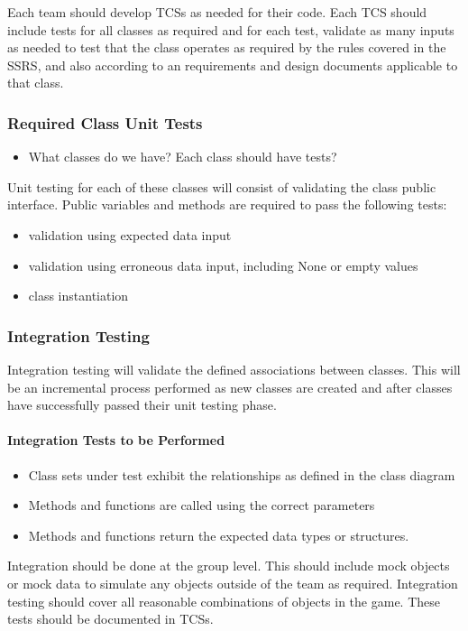 \documentclass[report]{article}
\begin{document}
Each team should develop TCSs as needed for their code. Each TCS should include tests for all classes as required and for each test, validate as many inputs as needed to test that the class operates as required by the rules covered in the SSRS, and also according to an requirements and design documents applicable to that class.

\subsubsection{Required Class Unit Tests}
\begin{itemize}
\item What classes do we have? Each class should have tests?
\end{itemize}
Unit testing for each of these classes will consist of validating the class public interface. Public variables and methods are required to pass the following tests:
\begin{itemize}
\item validation using expected data input
\item validation using erroneous data input, including None or empty values
\item class instantiation
\end{itemize}

\subsubsection{Integration Testing}
Integration testing will validate the defined associations between classes. This will be an incremental process performed as new classes are created and after classes have successfully passed their unit testing phase. 
\paragraph{Integration Tests to be Performed}
\begin{itemize}
\item Class sets under test exhibit the relationships as defined in the class diagram
\item Methods and functions are called using the correct parameters
\item Methods and functions return the expected data types or structures.
\end{itemize}

Integration should be done at the group level. This should include mock objects or mock data to simulate any objects outside of the team as required. Integration testing should cover all reasonable combinations of objects in the game. These tests should be documented in TCSs.
\end{document}
